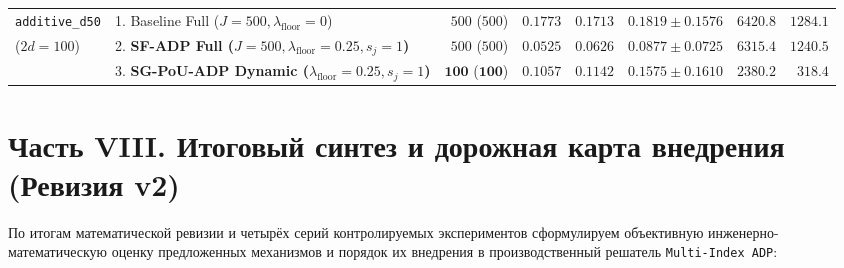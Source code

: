 \documentclass[11pt,a4paper]{article}
\theoremstyle{definition}
\theoremstyle{remark}
\begin{document}
\begin{table}[ht!]
{\begin{tabular}{@{}llrrrrrr@{}}
\midrule
\texttt{additive\_d50} & 1. Baseline Full ($J=500, \lambda_{\mathrm{floor}}=0$) & $500$ ($500$) & $0.1773$ & $0.1713$ & $0.1819 \pm 0.1576$ & $6420.8$ & $1284.1$ \\
($2d = 100$) & 2. \textbf{SF-ADP Full ($J=500, \lambda_{\mathrm{floor}}=0.25, s_j=1$)} & $500$ ($500$) & $\mathbf{0.0525}$ & $0.0626$ & $\mathbf{0.0877 \pm 0.0725}$ & $6315.4$ & $1240.5$ \\
 & 3. \textbf{SG-PoU-ADP Dynamic ($\lambda_{\mathrm{floor}}=0.25, s_j=1$)} & $\mathbf{100}$ ($\mathbf{100}$) & $\mathbf{0.1057}$ & $0.1142$ & $\mathbf{0.1575 \pm 0.1610}$ & $\mathbf{2380.2}$ & $\mathbf{318.4}$ \\
\bottomrule
\end{tabular}%
}
\end{table}

\section{Часть VIII. Итоговый синтез и дорожная карта внедрения (Ревизия v2)}
\label{sec:part8}

По итогам математической ревизии и четырёх серий контролируемых экспериментов сформулируем объективную инженерно-математическую оценку предложенных механизмов и порядок их внедрения в производственный решатель \texttt{Multi-Index ADP}:
\end{document}
